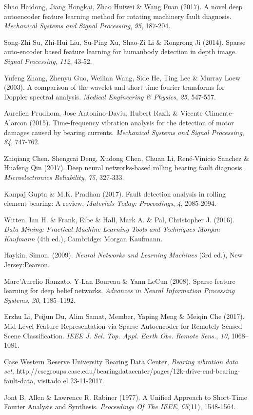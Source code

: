 \documentclass[a4paper,12pt]{article}
\begin{document}
\begin{thebibliography}{9}
 Shao Haidong, Jiang Hongkai, Zhao Huiwei \& Wang Fuan (2017). A novel deep autoencoder feature learning method for rotating machinery fault diagnosis. \textit{Mechanical Systems and Signal Processing}, \textit{95}, 187-204. 

 Song-Zhi Su, Zhi-Hui Liu, Su-Ping Xu, Shao-Zi Li \& Rongrong Ji (2014). Sparse auto-encoder based feature learning for humanbody detection in depth image. \textit{Signal Processing}, \textit{112}, 43-52.

 Yufeng Zhang, Zhenyu Guo, Weilian Wang, Side He, Ting Lee \& Murray Loew (2003). A comparison of the wavelet and short-time fourier transforms for Doppler spectral analysis. \textit{Medical Engineering \& Physics}, \textit{25}, 547-557.

 Aurelien Prudhom, Jose Antonino-Daviu, Hubert Razik \& Vicente Climente-Alarcon (2015). Time-frequency vibration analysis for the detection of motor damages caused by bearing currents. \textit{Mechanical Systems and Signal Processing}, \textit{84}, 747-762.

 Zhiqiang Chen, Shengcai Deng, Xudong Chen, Chuan Li, René-Vinicio Sanchez \& Huafeng Qin (2017). Deep neural networks-based rolling bearing fault diagnosis. \textit{Microelectronics Reliability}, \textit{75}, 327-333.

 Kanpaj Gupta \& M.K. Pradhan (2017). Fault detection analysis in rolling element bearing: A review, \textit{Materials Today: Proceedings}, \textit{4}, 2085-2094.

 Witten, Ian H. \& Frank, Eibe \& Hall, Mark A. \& Pal, Christopher J. (2016). \textit{Data Mining: Practical Machine Learning Tools and Techniques-Morgan Kaufmann} (4th ed.), Cambridge: Morgan Kaufmann.

 Haykin, Simon. (2009). \textit{Neural Networks and Learning Machines} (3rd ed.), New Jersey:Pearson.

 Marc’Aurelio Ranzato, Y-Lan Boureau \& Yann LeCun (2008). Sparse feature learning for deep belief networks. \textit{Advances in Neural Information Processing Systems}, \textit{20}, 1185–1192.

 Erzhu Li, Peijun Du, Alim Samat, Member, Yaping Meng \& Meiqin Che (2017). Mid-Level Feature Representation via Sparse Autoencoder for Remotely Sensed Scene Classification. \textit{IEEE J. Sel. Top. Appl. Earth Obs. Remote Sens.}, \textit{10}, 1068–1081.

 Case Western Reserve University Bearing Data Center, \textit{Bearing vibration data set}, http://csegroups.case.edu/bearingdatacenter/pages/12k-drive-end-bearing-fault-data, visitado el 23-11-2017.

 Jont B. Allen \& Lawrence R. Rabiner (1977). A Unified Approach to Short-Time Fourier Analysis
and Synthesis. \textit{Proceedings Of The IEEE}, \textit{65}(11), 1548-1564.

\end{thebibliography}
\end{document}
